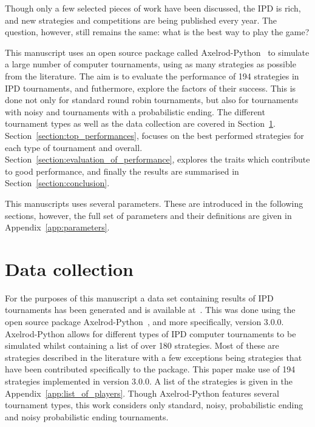 \documentclass{article}
\begin{document}
Though only a few selected pieces of work have been discussed, the IPD is
rich, and new strategies and competitions are being published every year.
The question, however, still remains the same: what is the best way to play the
game?

This manuscript uses an open source package called
Axelrod-Python~\cite{axelrodproject} to simulate a large number of computer
tournaments, using as many strategies as possible from the literature. The aim
is to evaluate the performance of 194 strategies in IPD tournaments, and
futhermore, explore the factors of their success. This is done not only for
standard round robin tournaments, but also for tournaments with noisy and
tournaments with a probabilistic ending. The different tournament types as well
as the data collection are covered in Section~\ref{section:data_collection}.
Section~\ref{section:top_performances}, focuses on the best performed strategies
for each type of tournament and overall.
Section~\ref{section:evaluation_of_performance}, explores the traits which
contribute to good performance, and finally the results are summarised in
Section~\ref{section:conclusion}.

This manuscripts uses several parameters. These are introduced in the following
sections, however, the full set of parameters and their definitions are given in
Appendix~\ref{app:parameters}. %

\section{Data collection}\label{section:data_collection}

For the purposes of this manuscript a data set containing results of IPD tournaments
has been generated and is available at~\cite{data}. This
was done using the open source package Axelrod-Python~\cite{axelrodproject}, and
more specifically, version 3.0.0. Axelrod-Python allows for different types of
IPD computer tournaments to be simulated whilst
containing a list of over 180 strategies. Most of these are strategies described
in the literature with a few exceptions being strategies that have been
contributed specifically to the package. This paper make use of 194 strategies
implemented in version 3.0.0. A list of the strategies is given in the
Appendix~\ref{app:list_of_players}. Though Axelrod-Python features several
tournament types, this work considers only standard, noisy, probabilistic ending
and noisy probabilistic ending tournaments.
\end{document}
